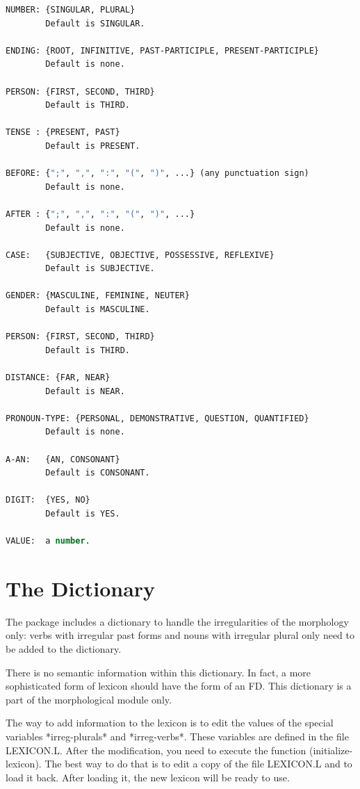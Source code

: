 \documentclass[10pt,a4paper]{report}
\begin{document}
\begin{lstlisting}[language=Lisp]
NUMBER: {SINGULAR, PLURAL}
        Default is SINGULAR.

ENDING: {ROOT, INFINITIVE, PAST-PARTICIPLE, PRESENT-PARTICIPLE}
        Default is none.

PERSON: {FIRST, SECOND, THIRD}
        Default is THIRD.

TENSE : {PRESENT, PAST}
        Default is PRESENT.

BEFORE: {";", ",", ":", "(", ")", ...} (any punctuation sign)
        Default is none.

AFTER : {";", ",", ":", "(", ")", ...}
        Default is none.

CASE:   {SUBJECTIVE, OBJECTIVE, POSSESSIVE, REFLEXIVE}
        Default is SUBJECTIVE.

GENDER: {MASCULINE, FEMININE, NEUTER}
        Default is MASCULINE.

PERSON: {FIRST, SECOND, THIRD}
        Default is THIRD.

DISTANCE: {FAR, NEAR}
        Default is NEAR.

PRONOUN-TYPE: {PERSONAL, DEMONSTRATIVE, QUESTION, QUANTIFIED}
        Default is none.

A-AN:   {AN, CONSONANT}
        Default is CONSONANT.

DIGIT:  {YES, NO}
        Default is YES.

VALUE:  a number.
\end{lstlisting}


\section{The Dictionary}

The package includes a dictionary to handle the irregularities of the
morphology only: verbs with irregular past forms and nouns with 
irregular plural only need to be added to the dictionary. 

There is no semantic information within this dictionary. In fact, a
more sophisticated form of lexicon should have the form of an FD. This
dictionary is a part of the morphological module only.

The way to add information to the lexicon is to edit the values of the 
special variables *irreg-plurals* and *irreg-verbs*. These variables
are defined in the file LEXICON.L. After the modification, you need
to execute the function (initialize-lexicon).
 
The best way to do that is to edit a copy of the file LEXICON.L and
to load it back. After loading it, the new lexicon will be ready to use.
\end{document}
